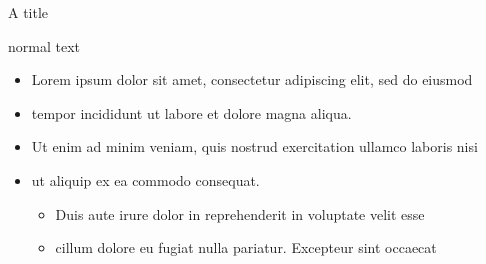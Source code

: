 \documentclass{beamer}
\begin{document}
\begin{frame}{A title}

normal text

{
  \setlength\leftmargini{0pt}
  \begin{itemize}
  \item Lorem ipsum dolor sit amet, consectetur adipiscing elit, sed do eiusmod
  \item tempor incididunt ut labore et dolore magna aliqua.
  \item Ut enim ad minim veniam, quis nostrud exercitation ullamco laboris nisi
  \item ut aliquip ex ea commodo consequat.
  \begin{itemize}
  \item Duis aute irure dolor in reprehenderit in voluptate velit esse
  \item cillum dolore eu fugiat nulla pariatur. Excepteur sint occaecat
  \end{itemize}
  \end{itemize}
}  

\end{frame}
\end{document}

